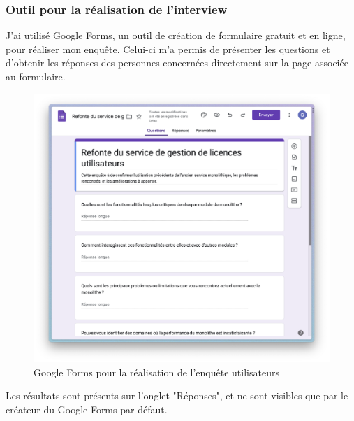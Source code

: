\documentclass[a4paper, 11pt]{report}
\begin{document}
\subsubsection{Outil pour la réalisation de l'interview}
J'ai utilisé Google Forms, un outil de création de formulaire gratuit et en ligne, pour réaliser mon enquête.
Celui-ci m'a permis de présenter les questions et d'obtenir les réponses des personnes concernées directement sur la page associée au formulaire.
  \begin{figure}[H]
      \centering
      \includegraphics[scale=0.40,center]{screenshots/enquete-utilisateur.png}
      \caption{Google Forms pour la réalisation de l'enquête utilisateurs}
  \end{figure}
Les résultats sont présents sur l'onglet "Réponses", et ne sont visibles que par le créateur du Google Forms par défaut.
\end{document}
